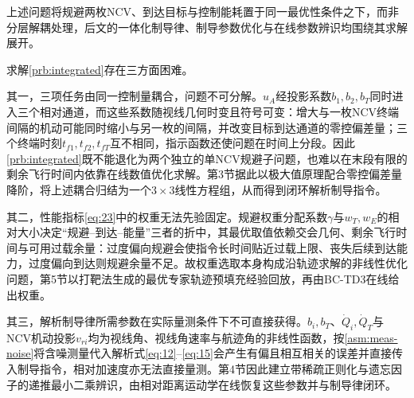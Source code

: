 上述问题将规避两枚NCV、到达目标与控制能耗置于同一最优性条件之下，而非分层解耦处理，后文的一体化制导律、制导参数优化与在线参数辨识均围绕其求解展开。

求解\cref{prb:integrated}存在三方面困难。

其一，三项任务由同一控制量耦合，问题不可分解。${u_A}$经投影系数${b_1},{b_2},{b_T}$同时进入三个相对通道，而这些系数随视线几何时变且符号可变：增大与一枚NCV终端间隔的机动可能同时缩小与另一枚的间隔，并改变目标到达通道的零控偏差量；三个终端时刻${t_{f1}},{t_{f2}},{t_{fT}}$互不相同，指示函数还使问题在时间上分段。因此\cref{prb:integrated}既不能退化为两个独立的单NCV规避子问题，也难以在末段有限的剩余飞行时间内依靠在线数值优化求解。第3节据此以极大值原理配合零控偏差量降阶，将上述耦合归结为一个$3 \times 3$线性方程组，从而得到闭环解析制导指令。

其二，性能指标\eqref{eq:23}中的权重无法先验固定。规避权重分配系数$\gamma $与${w_T},{w_E}$的相对大小决定“规避--到达--能量”三者的折中，其最优取值依赖交会几何、剩余飞行时间与可用过载余量：过度偏向规避会使指令长时间贴近过载上限、丧失后续到达能力，过度偏向到达则规避余量不足。故权重选取本身构成沿轨迹求解的非线性优化问题，第5节以打靶法生成的最优专家轨迹预填充经验回放，再由BC-TD3在线给出权重。

其三，解析制导律所需参数在实际量测条件下不可直接获得。${b_i},{b_T}$、${\dot Q_i},{\dot Q_T}$与NCV机动投影${v_{ri}}$均为视线角、视线角速率与航迹角的非线性函数，按\cref{asm:meas-noise}将含噪测量代入解析式\eqref{eq:12}--\eqref{eq:15}会产生有偏且相互相关的误差并直接传入制导指令，相对加速度亦无法直接量测。第4节因此建立带稀疏正则化与遗忘因子的递推最小二乘辨识，由相对距离运动学在线恢复这些参数并与制导律闭环。
